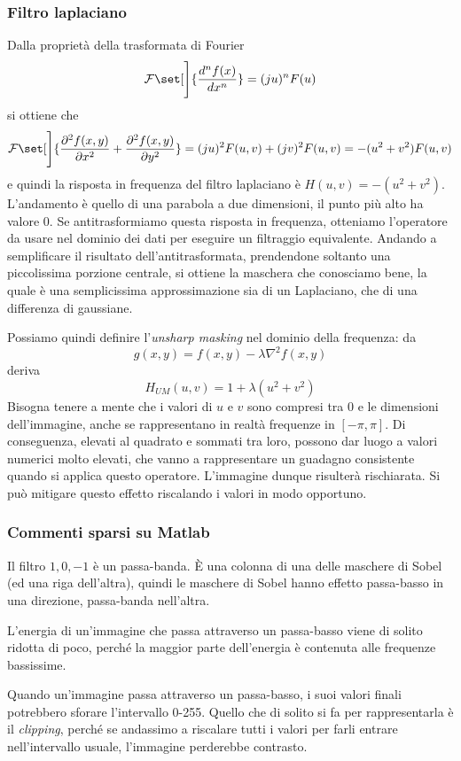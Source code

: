 \documentclass[a4paper,11pt]{article}
\DeclarePairedDelimiter\set\{\}
\begin{document}
\subsubsection{Filtro laplaciano}
Dalla proprietà della trasformata di Fourier
\[
\mathcal{F} \set[\Bigg]{\frac{d^n f(x)}{dx^n}} = (ju)^n F(u)
\]
si ottiene che
\[
\mathcal{F} \set[\Bigg]{
\frac{\partial^2 f(x,y)}{\partial x^2} + \frac{\partial^2 f(x,y)}{\partial y^2}
} = (ju)^2 F(u,v) + (jv)^2 F(u,v) = -(u^2 + v^2) F(u,v)
\]
e quindi la risposta in frequenza del filtro laplaciano è $H(u,v) = -(u^2 + v^2)$.
L'andamento è quello di una parabola a due dimensioni, il punto più alto ha valore 0.
Se antitrasformiamo questa risposta in frequenza, otteniamo l'operatore da usare nel dominio dei dati per eseguire un filtraggio equivalente.
Andando a semplificare il risultato dell'antitrasformata, prendendone soltanto una piccolissima porzione centrale, si ottiene la maschera che
conosciamo bene, la quale è una semplicissima approssimazione sia di un Laplaciano, che di una differenza di gaussiane.
\par
Possiamo quindi definire l'\textit{unsharp masking} nel dominio della frequenza: da
\[
g(x,y) = f(x,y) - \lambda \nabla^2 f(x,y)
\]
deriva
\[
H_{UM}(u,v) = 1 + \lambda (u^2 + v^2)
\]
Bisogna tenere a mente che i valori di $u$ e $v$ sono compresi tra 0 e le dimensioni dell'immagine, anche se rappresentano in realtà
frequenze in $[-\pi,\pi]$. Di conseguenza, elevati al quadrato e sommati tra loro, possono dar luogo a valori numerici molto elevati, che vanno
a rappresentare un guadagno consistente quando si applica questo operatore. L'immagine dunque risulterà rischiarata. Si può mitigare questo
effetto riscalando i valori in modo opportuno.

\subsubsection{Commenti sparsi su Matlab}
Il filtro $1, 0, -1$ è un passa-banda. È una colonna di una delle maschere di Sobel (ed una riga dell'altra), quindi le maschere di Sobel
hanno effetto passa-basso in una direzione, passa-banda nell'altra.
\par
L'energia di un'immagine che passa attraverso un passa-basso viene di solito ridotta di poco, perché la maggior parte dell'energia
è contenuta alle frequenze bassissime.
\par
Quando un'immagine passa attraverso un passa-basso, i suoi valori finali potrebbero sforare l'intervallo 0-255. Quello che di solito
si fa per rappresentarla è il \textit{clipping}, perché se andassimo a riscalare tutti i valori per farli entrare nell'intervallo usuale,
l'immagine perderebbe contrasto.
\end{document}
